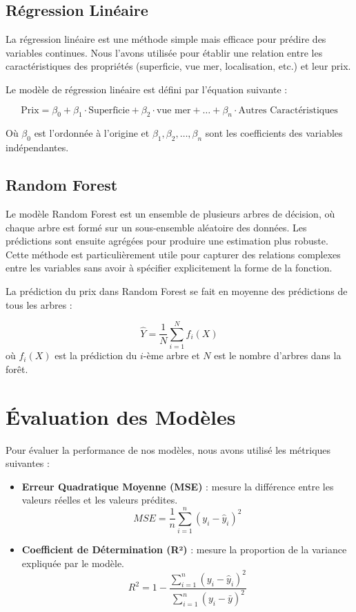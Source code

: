 \documentclass[a4paper,12pt,french]{article}
\begin{document}
\subsection{Régression Linéaire}
La régression linéaire est une méthode simple mais efficace pour prédire des variables continues. Nous l'avons utilisée pour établir une relation entre les caractéristiques des propriétés (superficie, vue mer, localisation, etc.) et leur prix.

Le modèle de régression linéaire est défini par l'équation suivante :

\[
\text{Prix} = \beta_0 + \beta_1 \cdot \text{Superficie} + \beta_2 \cdot \text{vue mer} + \dots + \beta_n \cdot \text{Autres Caractéristiques}
\]

Où \( \beta_0 \) est l'ordonnée à l'origine et \( \beta_1, \beta_2, \dots, \beta_n \) sont les coefficients des variables indépendantes.

\subsection{Random Forest}
Le modèle Random Forest est un ensemble de plusieurs arbres de décision, où chaque arbre est formé sur un sous-ensemble aléatoire des données. Les prédictions sont ensuite agrégées pour produire une estimation plus robuste. Cette méthode est particulièrement utile pour capturer des relations complexes entre les variables sans avoir à spécifier explicitement la forme de la fonction.

La prédiction du prix dans Random Forest se fait en moyenne des prédictions de tous les arbres :

\[
\hat{Y} = \frac{1}{N} \sum_{i=1}^N f_i(X)
\]
où \( f_i(X) \) est la prédiction du \( i \)-ème arbre et \( N \) est le nombre d'arbres dans la forêt.

\newpage

\section{Évaluation des Modèles}

Pour évaluer la performance de nos modèles, nous avons utilisé les métriques suivantes :

\begin{itemize}
    \item \textbf{Erreur Quadratique Moyenne (MSE)} : mesure la différence entre les valeurs réelles et les valeurs prédites.
    \[
    MSE = \frac{1}{n} \sum_{i=1}^{n} (y_i - \hat{y}_i)^2
    \]
    \item \textbf{Coefficient de Détermination (R²)} : mesure la proportion de la variance expliquée par le modèle.
    \[
    R^2 = 1 - \frac{\sum_{i=1}^{n} (y_i - \hat{y}_i)^2}{\sum_{i=1}^{n} (y_i - \bar{y})^2}
    \]
\end{itemize}
\end{document}
